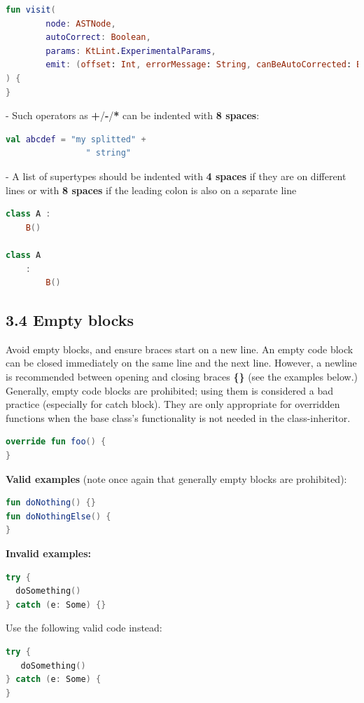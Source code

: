 \begin{lstlisting}[language=Kotlin]
fun visit(
        node: ASTNode,
        autoCorrect: Boolean,
        params: KtLint.ExperimentalParams,
        emit: (offset: Int, errorMessage: String, canBeAutoCorrected: Boolean) -> Unit
) {
}
\end{lstlisting}

- Such operators as \textbf{+}/\textbf{-}/\textbf{*} can be indented with \textbf{8 spaces}:

\begin{lstlisting}[language=Kotlin]
val abcdef = "my splitted" +
                " string"
\end{lstlisting}

- A list of supertypes should be indented with \textbf{4 spaces} if they are on different lines or with \textbf{8 spaces} if the leading colon is also on a separate line
\begin{lstlisting}[language=Kotlin]
class A :
    B()

class A
    :
        B()
\end{lstlisting}
\subsection*{\textbf{3.4 Empty blocks}}
\label{sec:3.4}
Avoid empty blocks, and ensure braces start on a new line. An empty code block can be closed immediately on the same line and the next line. However, a newline is recommended between opening and closing braces \textbf{\{\}} (see the examples below.)
Generally, empty code blocks are prohibited; using them is considered a bad practice (especially for catch block).
They are only appropriate for overridden functions when the base class's functionality is not needed in the class-inheritor.
\begin{lstlisting}[language=Kotlin]
override fun foo() {
}
\end{lstlisting}
\textbf{Valid examples} (note once again that generally empty blocks are prohibited):
\begin{lstlisting}[language=Kotlin]
fun doNothing() {}
fun doNothingElse() {
}
\end{lstlisting}
\textbf{Invalid examples:}
\begin{lstlisting}[language=Kotlin]
try {
  doSomething()
} catch (e: Some) {}
\end{lstlisting}
Use the following valid code instead:
\begin{lstlisting}[language=Kotlin]
try {
   doSomething()
} catch (e: Some) {
}
\end{lstlisting}
